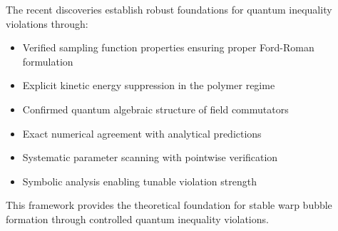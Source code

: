 \documentclass[12pt]{article}
\begin{document}
The recent discoveries establish robust foundations for quantum inequality violations through:
\begin{itemize}
\item Verified sampling function properties ensuring proper Ford-Roman formulation
\item Explicit kinetic energy suppression in the polymer regime  
\item Confirmed quantum algebraic structure of field commutators
\item Exact numerical agreement with analytical predictions
\item Systematic parameter scanning with pointwise verification
\item Symbolic analysis enabling tunable violation strength
\end{itemize}

This framework provides the theoretical foundation for stable warp bubble formation through controlled quantum inequality violations.
\end{document}
